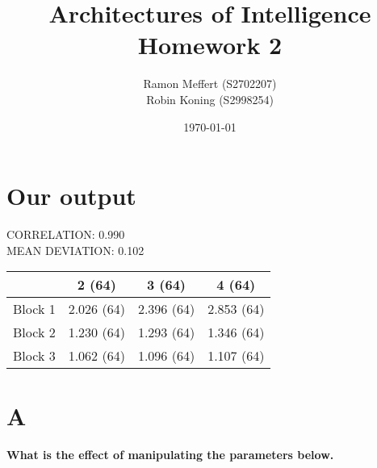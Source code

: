 \documentclass[11pt,a4paper,titlepage]{article}
\title{Architectures of Intelligence \\ Homework 2}
\author{Ramon Meffert (S2702207) \\ Robin Koning (S2998254)}
\date{\today}
\begin{document}
\maketitle{}
\newpage

\section{Our output}
CORRELATION:  0.990\\
MEAN DEVIATION:  0.102\\

\begin{tabular}{c|c|c|c}
  &2 (64)&3 (64)&4 (64)\\
  \hline
  Block 1&2.026 (64)&2.396 (64)&2.853 (64)\\
  Block 2&1.230 (64)&1.293 (64)&1.346 (64)\\
  Block 3&1.062 (64)&1.096 (64)&1.107 (64)
  
\end{tabular}

\section{A}
\textbf{What is the effect of manipulating the parameters below.}
\end{document}
